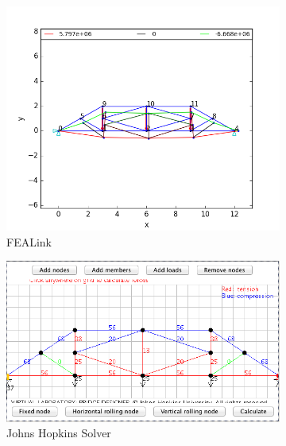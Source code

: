 \documentclass[11pt, oneside]{article}   	%
\begin{document}
\begin{figure}
\centering
  \begin{subfigure}[b]{0.45\textwidth}
    \includegraphics[width=\textwidth]{Verification/FEALink/Verification2.png}
    \caption{FEALink}
    \label{fig:V2FEALink}
  \end{subfigure}
  \begin{subfigure}[b]{0.45\textwidth}
    \includegraphics[width=\textwidth]{Verification/JH/Verification2.png}
    \caption{Johns Hopkins Solver}
    \label{fig:V2JH}
  \end{subfigure}
  \begin{subfigure}[b]{.45\textwidth}

\end{subfigure}
\end{figure}
\end{document}
